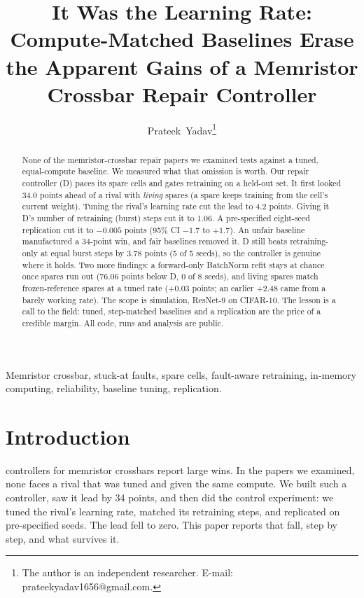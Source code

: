 \documentclass[journal]{IEEEtran}
\begin{document}
\title{It Was the Learning Rate: Compute-Matched Baselines Erase the Apparent Gains of a Memristor Crossbar Repair Controller}

\author{Prateek~Yadav\thanks{The author is an independent researcher. E-mail: prateekyadav1656@gmail.com.}}

\maketitle

\begin{abstract}
None of the memristor-crossbar repair papers we examined tests against a tuned, equal-compute baseline.
We measured what that omission is worth.
Our repair controller (D) paces its spare cells and gates retraining on a held-out set.
It first looked 34.0 points ahead of a rival with \emph{living} spares (a spare keeps training from the cell's current weight).
Tuning the rival's learning rate cut the lead to 4.2 points.
Giving it D's number of retraining (burst) steps cut it to 1.06.
A pre-specified eight-seed replication cut it to $-0.005$ points (95\% CI $-1.7$ to $+1.7$).
An unfair baseline manufactured a 34-point win, and fair baselines removed it.
D still beats retraining-only at equal burst steps by 3.78 points (5 of 5 seeds), so the controller is genuine where it holds.
Two more findings: a forward-only BatchNorm refit stays at chance once spares run out (76.06 points below D, 0 of 8 seeds), and living spares match frozen-reference spares at a tuned rate (+0.03 points; an earlier +2.48 came from a barely working rate).
The scope is simulation, ResNet-9 on CIFAR-10.
The lesson is a call to the field: tuned, step-matched baselines and a replication are the price of a credible margin.
All code, runs and analysis are public.
\end{abstract}


\begin{IEEEkeywords}
Memristor crossbar, stuck-at faults, spare cells, fault-aware retraining, in-memory computing, reliability, baseline tuning, replication.
\end{IEEEkeywords}

\section{Introduction}
 controllers for memristor crossbars report large wins.
In the papers we examined, none faces a rival that was tuned and given the same compute.
We built such a controller, saw it lead by 34 points, and then did the control experiment: we tuned the rival's learning rate, matched its retraining steps, and replicated on pre-specified seeds.
The lead fell to zero.
This paper reports that fall, step by step, and what survives it.
\end{document}
